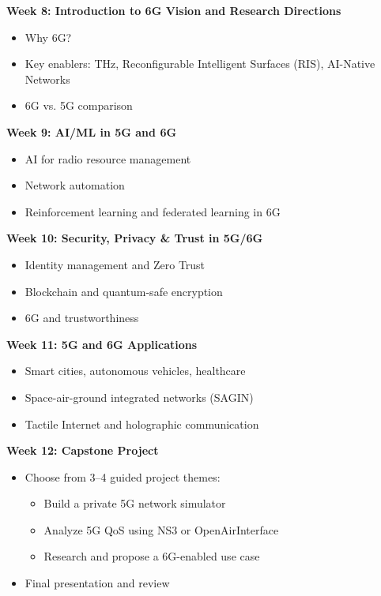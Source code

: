 \noindent
\faChevronCircleRight\hspace{0.5em} \textbf{Week 8: Introduction to 6G Vision and Research Directions}
\begin{itemize}
    \item Why 6G?
    \item Key enablers: THz, Reconfigurable Intelligent Surfaces (RIS), AI-Native Networks
    \item 6G vs. 5G comparison
\end{itemize}

\noindent
\faChevronCircleRight\hspace{0.5em} \textbf{Week 9: AI/ML in 5G and 6G}
\begin{itemize}
    \item AI for radio resource management
    \item Network automation
    \item Reinforcement learning and federated learning in 6G
\end{itemize}

\noindent
\faChevronCircleRight\hspace{0.5em} \textbf{Week 10: Security, Privacy \& Trust in 5G/6G}
\begin{itemize}
    \item Identity management and Zero Trust
    \item Blockchain and quantum-safe encryption
    \item 6G and trustworthiness
\end{itemize}

\noindent
\faChevronCircleRight\hspace{0.5em} \textbf{Week 11: 5G and 6G Applications}
\begin{itemize}
    \item Smart cities, autonomous vehicles, healthcare
    \item Space-air-ground integrated networks (SAGIN)
    \item Tactile Internet and holographic communication
\end{itemize}

\noindent
\faChevronCircleRight\hspace{0.5em} \textbf{Week 12: Capstone Project}
\begin{itemize}
    \item Choose from 3–4 guided project themes:
    \begin{itemize}
        \item Build a private 5G network simulator
        \item Analyze 5G QoS using NS3 or OpenAirInterface
        \item Research and propose a 6G-enabled use case
    \end{itemize}
    \item Final presentation and review
\end{itemize}
